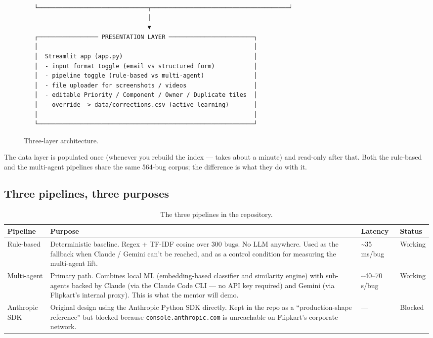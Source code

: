 \documentclass[11pt,a4paper]{article}
\begin{document}
\begin{figure}[h]
\begin{minipage}{0.95\textwidth}
\begin{lstlisting}
   └───────────────────────────────┬───────────────────────────────────────┘
                                   │
                                   ▼
   ┌───────────────── PRESENTATION LAYER ────────────────────────┐
   │                                                             │
   │  Streamlit app (app.py)                                     │
   │  - input format toggle (email vs structured form)           │
   │  - pipeline toggle (rule-based vs multi-agent)              │
   │  - file uploader for screenshots / videos                   │
   │  - editable Priority / Component / Owner / Duplicate tiles  │
   │  - override -> data/corrections.csv (active learning)       │
   │                                                             │
   └─────────────────────────────────────────────────────────────┘
\end{lstlisting}
\end{minipage}
\caption{Three-layer architecture.}
\end{figure}

The data layer is populated once (whenever you rebuild the index --- takes
about a minute) and read-only after that. Both the rule-based and the
multi-agent pipelines share the same 564-bug corpus; the difference is what
they do with it.

\subsection{Three pipelines, three purposes}

\begin{table}[h]
\centering
\small
\begin{tabularx}{\linewidth}{lXll}
\toprule
\textbf{Pipeline} & \textbf{Purpose} & \textbf{Latency} & \textbf{Status} \\
\midrule
Rule-based           & Deterministic baseline. Regex + TF-IDF cosine over 300 bugs. No LLM anywhere. Used as the fallback when Claude / Gemini can't be reached, and as a control condition for measuring the multi-agent lift. & \textasciitilde 35 ms/bug & Working \\
\addlinespace
Multi-agent          & Primary path. Combines local ML (embedding-based classifier and similarity engine) with sub-agents backed by Claude (via the Claude Code CLI --- no API key required) and Gemini (via Flipkart's internal proxy). This is what the mentor will demo. & \textasciitilde 40--70 s/bug & Working \\
\addlinespace
Anthropic SDK        & Original design using the Anthropic Python SDK directly. Kept in the repo as a ``production-shape reference'' but blocked because \texttt{console.anthropic.com} is unreachable on Flipkart's corporate network. & --- & Blocked \\
\bottomrule
\end{tabularx}
\caption{The three pipelines in the repository.}
\end{table}
\end{document}
